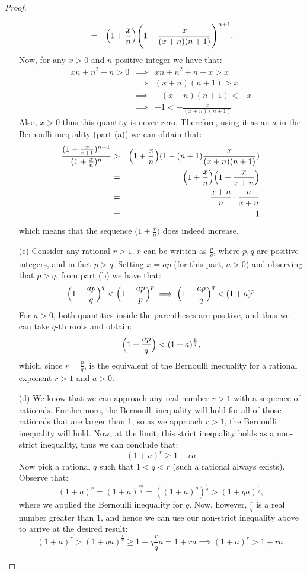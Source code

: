 \begin{proof}
\begin{enumerate}
\begin{eqnarray*}
        & = & \Bigl(1+\frac{x}{n}\Bigr) \Biggl(1 - \frac{x}{(x+n)(n+1)}\Biggr)^{n+1}.
    \end{eqnarray*}
    Now, for any $x > 0$ and $n$ positive integer we have that:
    \begin{eqnarray*}
        xn +n^2+n > 0 
        & \implies & xn + n^2 + n + x > x\\
        & \implies & (x+n)(n+1) > x\\
        & \implies & - (x+n)(n+1) < -x\\
        & \implies & -1 < -\frac{x}{(x+n)(n+1)}
    \end{eqnarray*}
    Also, $x > 0$ thus this quantity is never zero. Therefore, using it as an $a$ in the Bernoulli inequality (part (a)) we can obtain that:
    \begin{eqnarray*}
        \frac{(1+\frac{x}{n+1})^{n+1}}{(1+\frac{x}{n})^n} & > & \Bigl(1+\frac{x}{n}\Bigr)(1 - (n+1)\frac{x}{(x+n)(n+1)})\\
        & = & \Bigl(1+\frac{x}{n}\Bigr)\Bigl(1 - \frac{x}{x+n}\Bigr)\\
        & = & \frac{x+n}{n}\cdot\frac{n}{x+n}\\
        & = & 1
    \end{eqnarray*}
    which means that the sequence $\bigl(1+\frac{x}{n}\bigr)$ does indeed increase.
    \item[(c)] Consider any rational $r > 1$. $r$ can be written as $\frac{p}{q}$, where $p, q$ are positive integers, and in fact $p > q$. Setting $x = ap$ (for this part, $a > 0$) and observing that $p > q$, from part (b) we have that: 
    $$\Bigl(1 + \frac{ap}{q}\Bigr)^q < \Bigl(1+\frac{ap}{p}\Bigr)^p \implies \Bigl(1 + \frac{ap}{q}\Bigr)^q < (1 + a)^p$$
    For $a > 0$, both quantities inside the parentheses are positive, and thus we can take $q$-th roots and obtain:
    $$\Bigl(1 + \frac{ap}{q}\Bigr) < (1+a)^{\frac{p}{q}},$$
    which, since $r = \frac{p}{q}$, is the equivalent of the Bernoulli inequality for a rational exponent $r > 1$ and $ a > 0$.
    \item[(d)] We know that we can approach any real number $r > 1$ with a sequence of rationals. Furthermore, the Bernoulli inequality will hold for all of those rationals that are larger than 1, so as we approach $r > 1$, the Bernoulli inequality will hold. Now, at the limit, this strict inequality holds as a non-strict inequality, thus we can conclude that:
    $$(1+a)^r \geq 1 + ra$$
    Now pick a rational $q$ such that $1 < q < r$ (such a rational always exists). Observe that:
    $$(1+a)^r = (1+a)^{\frac{rq}{q}} = ((1+a)^q)^{\frac{r}{q}} > (1+qa)^{\frac{r}{q}},$$
    where we applied the Bernoulli inequality for $q$. Now, however, $\frac{r}{q}$ is a real number greater than 1, and hence we can use our non-strict inequality above to arrive at the desired result:
    $$(1+a)^r > (1+qa)^{\frac{r}{q}} \geq 1 + q\frac{r}{q}a = 1 + ra \implies (1+a)^r > 1 + ra.$$
    \end{enumerate}
\end{proof}



